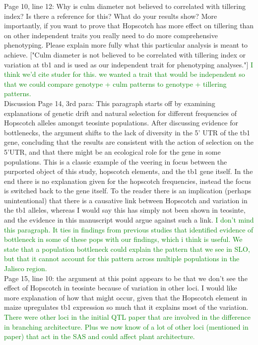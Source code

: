 \documentclass[11pt]{article}
\newcommand{\lev}[1]{\noindent \textcolor{green}{{#1}} \\}
\begin{document}
Page 10, line 12: Why is culm diameter not believed to correlated with tillering index?  Is there a reference for this? What do your results show?  More importantly, if you want to prove that Hopscotch has more effect on tillering than on other independent traits you really need to do more comprehensive phenotyping.  Please explain more fully what this particular analysis is meant to achieve.
["Culm diameter is not believed to be correlated with tillering index or variation at tb1 and is used as our independent trait for phenotyping analyses."]
\lev{I think we'd cite studer for this. we wanted a trait that would be independent so that we could compare genotype + culm patterns to genotype + tillering patterns.}
Discussion
Page 14, 3rd para: This paragraph starts off by examining explanations of genetic drift and natural selection for different frequencies of Hopscotch alleles amongst teosinte populations.  After discussing evidence for bottlenecks, the argument shifts to the lack of diversity in the 5' UTR of the tb1 gene, concluding that the results are consistent with the action of selection on the 5'UTR, and that there might be an ecological role for the gene in some populations.  This is a classic example of the veering in focus between the purported object of this study, hopscotch elements, and the tb1 gene itself.  In the end there is no explanation given for the hopscotch frequencies, instead the focus is switched back to the gene itself.  To the reader there is an implication (perhaps unintentional) that there is a causative link between Hopscotch and variation in the tb1 alleles, whereas I would say this has simply not been shown in teosinte, and the evidence in this manuscript would
argue against such a link.
\lev{I don't mind this paragraph. It ties in findings from previous studies that identified evidence of bottleneck in some of these pops with our findings, which i think is useful. We state that a population bottleneck could explain the pattern that we see in SLO, but that it cannot account for this pattern across multiple populations in the Jalisco region.}

Page 15, line 10: the argument at this point appears to be that we don't see the effect of Hopscotch in teosinte because of variation in other loci.  I would like more explanation of how that might occur, given that the Hopscotch element in maize upregulates tb1 expression so much that it explains most of the variation.  
\lev{There were other loci in the initial QTL paper that are involved in the difference in branching architecture. Plus we now know of a lot of other loci (mentioned in paper) that act in the SAS and could affect plant architecture.}
\end{document}
